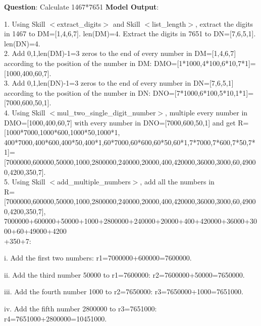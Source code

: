 \documentclass{article} %
\begin{document}
\noindent\begin{minipage}{\textwidth}
 \label{Tab:example_simple_add_skill}
\end{minipage}


\newpage


\begin{tcolorbox}[title = {Multiplication}, colback = Apricot!25!white, colframe = BrickRed!75!black,] 
\textbf{Question}: Calculate 1467*7651
\tcblower
\textbf{Model Output}:

\quad

1. Using Skill $<$extract\_digits$>$ and Skill $<$list\_length$>$, extract the digits in 1467 to DM=[1,4,6,7]. len(DM)=4. Extract the digits in 7651 to DN=[7,6,5,1]. len(DN)=4. \\ 
2. Add 0,1,len(DM)-1=3 zeros to the end of every number in DM=[1,4,6,7] according to the position of the number in DM: DMO=[1*1000,4*100,6*10,7*1]=[1000,400,60,7]. \\
3. Add 0,1,len(DN)-1=3 zeros to the end of every number in DN=[7,6,5,1] according to the position of the number in DN: DNO=[7*1000,6*100,5*10,1*1]=[7000,600,50,1]. \\
4. Using Skill $<$mul\_two\_single\_digit\_number$>$, multiple every number in DMO=[1000,400,60,7] with  every number in DNO=[7000,600,50,1]  and get R=[1000*7000,1000*600,1000*50,1000*1, 400*7000,400*600,400*50,400*1,60*7000,60*600,60*50,60*1,7*7000,7*600,7*50,7*1]=  [7000000,600000,50000,1000,2800000,240000,20000,400,420000,36000,3000,60,49000,4200,350,7]. \\
5. Using Skill $<$add\_multiple\_numbers$>$, add all the numbers  in \\ R=[7000000,600000,50000,1000,2800000,240000,20000,400,420000,36000,3000,60,49000,4200,350,7], 7000000+600000+50000+1000+2800000+240000+20000+400+420000+36000+3000+60+49000+4200\\+350+7: 

\quad 

    \qquad i. Add the first two numbers: r1=7000000+600000=7600000. 
    
    \qquad ii. Add the third number 50000 to r1=7600000: r2=7600000+50000=7650000. 
    
    \qquad iii. Add the fourth number 1000 to r2=7650000: r3=7650000+1000=7651000. 
    
    \qquad iv. Add the fifth number 2800000 to r3=7651000: r4=7651000+2800000=10451000. 
    

\end{tcolorbox}
\end{document}
